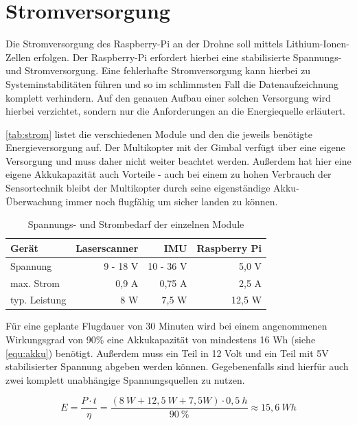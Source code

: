 \documentclass[a4paper,12pt,bibliography=totoc, listof=totoc,titlepage,pointlessnumbers]{scrreprt}
\begin{document}
\section{Stromversorgung}
Die Stromversorgung des Raspberry-Pi an der Drohne soll mittels Lithium-Ionen-Zellen erfolgen. Der Raspberry-Pi erfordert hierbei eine stabilisierte Spannungs- und Stromversorgung. Eine fehlerhafte Stromversorgung kann hierbei zu Systeminstabilitäten führen und so im schlimmsten Fall die Datenaufzeichnung komplett verhindern. Auf den genauen Aufbau einer solchen Versorgung wird hierbei verzichtet, sondern nur die Anforderungen an die Energiequelle erläutert.

\autoref{tab:strom} listet die verschiedenen Module und den die jeweils benötigte Energieversorgung auf. Der Multikopter mit der Gimbal verfügt über eine eigene Versorgung und muss daher nicht weiter beachtet werden. Außerdem hat hier eine eigene Akkukapazität auch Vorteile - auch bei einem zu hohen Verbrauch der Sensortechnik bleibt der Multikopter durch seine eigenständige Akku-Überwachung immer noch flugfähig um sicher landen zu können.

\begin{table}
\centering
\begin{tabular}{ l | r | r | r }
  Gerät 	& Laserscanner	& IMU		& Raspberry Pi\\
  \hline
  Spannung 	& 9 - 18 V 	& 10 - 36 V	& 5,0 V \\
  \hline
  max. Strom 	& 0,9 A		& 0,75 A	& 2,5 A \\
  \hline
  typ. Leistung	& 8 W		& 7,5 W		& 12,5 W 
\end{tabular}
\caption{Spannungs- und Strombedarf der einzelnen Module \citep{vlpSheet,imar,raspSheet}}
\label{tab:strom}
\end{table}

Für eine geplante Flugdauer von 30 Minuten wird bei einem angenommenen Wirkungsgrad von 90\% eine Akkukapazität von mindestens 16 Wh (siehe \autoref{equ:akku}) benötigt. Außerdem muss ein Teil in 12 Volt und ein Teil mit 5V stabilisierter Spannung abgeben werden können. Gegebenenfalls sind hierfür auch zwei komplett unabhängige Spannungsquellen zu nutzen.

\begin{equation}
\label{equ:akku}
E = \frac{ P \cdot t}{\eta} = \frac{(8~W + 12,5~W + 7,5W) \cdot 0,5~h}{90~\%} \approx 15,6~Wh
\end{equation}
\end{document}
